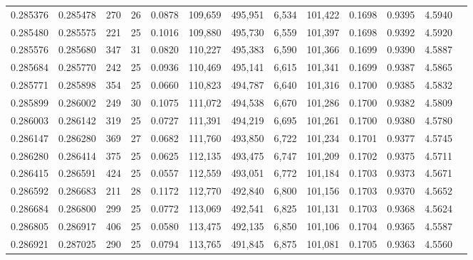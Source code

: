 \begin{tabular}{rrrrrrrrrrrrr}
0.285376 & 0.285478 &   270 &  26 &                                     0.0878 & 109,659 & 495,951 &   6,534 & 101,422 & 0.1698 & 0.9395 & 4.5940 \\
0.285480 & 0.285575 &   221 &  25 &                                     0.1016 & 109,880 & 495,730 &   6,559 & 101,397 & 0.1698 & 0.9392 & 4.5920 \\
0.285576 & 0.285680 &   347 &  31 &                                     0.0820 & 110,227 & 495,383 &   6,590 & 101,366 & 0.1699 & 0.9390 & 4.5887 \\
0.285684 & 0.285770 &   242 &  25 &                                     0.0936 & 110,469 & 495,141 &   6,615 & 101,341 & 0.1699 & 0.9387 & 4.5865 \\
0.285771 & 0.285898 &   354 &  25 &                                     0.0660 & 110,823 & 494,787 &   6,640 & 101,316 & 0.1700 & 0.9385 & 4.5832 \\
0.285899 & 0.286002 &   249 &  30 &                                     0.1075 & 111,072 & 494,538 &   6,670 & 101,286 & 0.1700 & 0.9382 & 4.5809 \\
0.286003 & 0.286142 &   319 &  25 &                                     0.0727 & 111,391 & 494,219 &   6,695 & 101,261 & 0.1700 & 0.9380 & 4.5780 \\
0.286147 & 0.286280 &   369 &  27 &                                     0.0682 & 111,760 & 493,850 &   6,722 & 101,234 & 0.1701 & 0.9377 & 4.5745 \\
0.286280 & 0.286414 &   375 &  25 &                                     0.0625 & 112,135 & 493,475 &   6,747 & 101,209 & 0.1702 & 0.9375 & 4.5711 \\
0.286415 & 0.286591 &   424 &  25 &                                     0.0557 & 112,559 & 493,051 &   6,772 & 101,184 & 0.1703 & 0.9373 & 4.5671 \\
0.286592 & 0.286683 &   211 &  28 &                                     0.1172 & 112,770 & 492,840 &   6,800 & 101,156 & 0.1703 & 0.9370 & 4.5652 \\
0.286684 & 0.286800 &   299 &  25 &                                     0.0772 & 113,069 & 492,541 &   6,825 & 101,131 & 0.1703 & 0.9368 & 4.5624 \\
0.286805 & 0.286917 &   406 &  25 &                                     0.0580 & 113,475 & 492,135 &   6,850 & 101,106 & 0.1704 & 0.9365 & 4.5587 \\
0.286921 & 0.287025 &   290 &  25 &                                     0.0794 & 113,765 & 491,845 &   6,875 & 101,081 & 0.1705 & 0.9363 & 4.5560 \\

\end{tabular}
